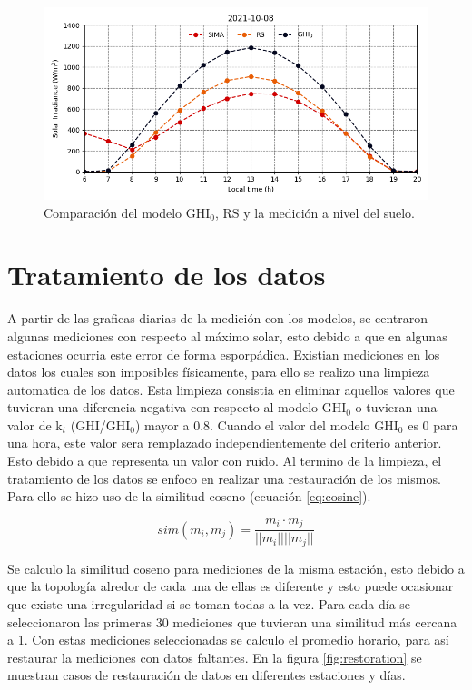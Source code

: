 \begin{figure}[H]
  \centering
  \includegraphics[width=14cm]{Graphics/2021-10-08.png}
  \caption{Comparación del modelo GHI$_0$, RS y la medición a nivel del suelo.}
  \label{fig:comparison_models}
\end{figure}

\section{Tratamiento de los datos}

A partir de las graficas diarias de la medición con los modelos, se centraron algunas mediciones con respecto al máximo solar, esto debido a que en algunas estaciones ocurria este error de forma esporpádica. Existian mediciones en los datos los cuales son imposibles físicamente, para ello se realizo una limpieza automatica de los datos. Esta limpieza consistia en eliminar aquellos valores que tuvieran una diferencia negativa con respecto al modelo GHI$_0$ o tuvieran una valor de k$_t$ (GHI/GHI$_0$) mayor a 0.8. Cuando el valor del modelo GHI$_0$ es 0 para una hora, este valor sera remplazado independientemente del criterio anterior. Esto debido a que representa un valor con ruido. Al termino de la limpieza, el tratamiento de los datos se enfoco en realizar una restauración de los mismos. Para ello se hizo uso de la similitud coseno (ecuación \ref{eq:cosine}).


\begin{equation}
  sim(m_i , m_j ) = \frac{m_i \cdot m_j}{||m_i|| ||m_j||}
  \label{eq:cosine}
\end{equation}

Se calculo la similitud coseno para mediciones de la misma estación, esto debido a que la topología alredor de cada una de ellas es diferente y esto puede ocasionar que existe una irregularidad si se toman todas a la vez. Para cada día se seleccionaron las primeras 30 mediciones que tuvieran una similitud más cercana a 1. Con estas mediciones seleccionadas se calculo el promedio horario, para así restaurar la mediciones con datos faltantes. En la figura \ref{fig:restoration} se muestran casos de restauración de datos en diferentes estaciones y días.

